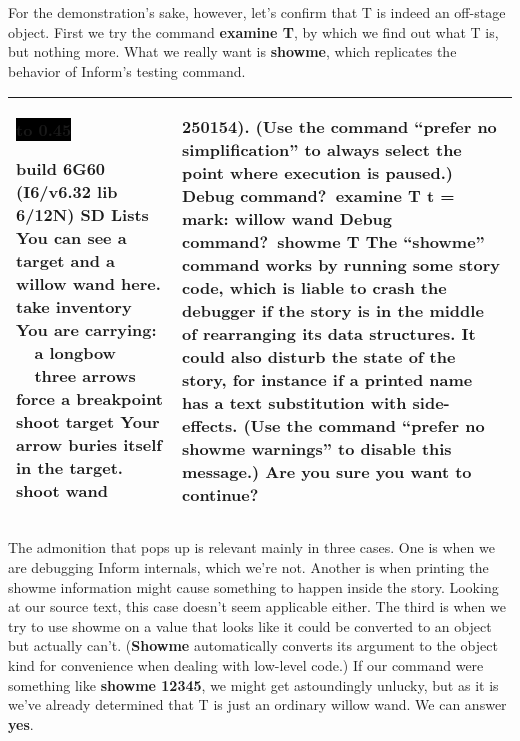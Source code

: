 \documentclass{book}
\newcommand{\n}{\hspace*{\fill}\newline}
\newcommand{\terp}[2]{\begin{center}\begin{tabular}{p{0.45\textwidth}|p{0.45\textwidth}}\midrule #1&#2\\\midrule\end{tabular}\end{center}}
\newcommand{\glkheading}[1]{\textbf{#1}}
\newcommand{\glkinput}[1]{\textbf{#1}}
\newcommand{\glkstatusline}[2]{\centerline{\colorbox{black}{\hbox to 0.45\textwidth{\textcolor{white}{#1\hfil #2}}}}}
\newcommand{\storyprompt}{\raisebox{1.5pt}{\(>\)}}
\newcommand{\cursor}{\raisebox{-1.5pt}{\RectangleThin}}
\begin{document}
For the demonstration's sake, however, let's confirm that T is indeed an
off-stage object.  First we try the command \glkinput{examine T}, by which we
find out what T is, but nothing more.  What we really want is \glkinput{showme},
which replicates the behavior of Inform's testing command.

\terp{\glkstatusline{Lists}{0/3}\n
  build 6G60 (I6/v6.32 lib 6/12N) SD\n
  \n
  \glkheading{Lists}\n
  You can see a target and a willow wand here.\n
  \n
  \storyprompt\glkinput{take inventory}\n
  You are carrying:\n
  \null\ \ a longbow\n
  \null\ \ three arrows\n
  \n
  \storyprompt\glkinput{force a breakpoint}\n
  \storyprompt\glkinput{shoot target}\n
  Your arrow buries itself in the target.\n
  \n
  \storyprompt\glkinput{shoot wand}\n
  \n
  [** Programming error: tried to ``move'' arrow to nothing **]}{%
  250154).\n
  (Use the command ``prefer no simplification'' to always select the point where execution is paused.)\n
  \n
  Debug command?\ \glkinput{examine T}\n
  \n
  t = mark: willow wand\n
  \n
  Debug command?\ \glkinput{showme T}\n
  \n
  The ``showme'' command works by running some story code, which is liable to crash the debugger if the story is in the middle of rearranging its data structures.  It could also disturb the state of the story, for instance if a printed name has a text substitution with side-effects.  (Use the command ``prefer no showme warnings'' to disable this message.)  Are you sure you want to continue?\ \cursor}

The admonition that pops up is relevant mainly in three cases.  One is when we
are debugging Inform internals, which we're not.  Another is when printing the
showme information might cause something to happen inside the story.  Looking at
our source text, this case doesn't seem applicable either.  The third is when we
try to use showme on a value that looks like it could be converted to an object
but actually can't.  (\glkinput{Showme} automatically converts its argument to
the object kind for convenience when dealing with low-level code.)  If our
command were something like \glkinput{showme 12345}, we might get astoundingly
unlucky, but as it is we've already determined that T is just an ordinary willow
wand.  We can answer \glkinput{yes}.
\end{document}
